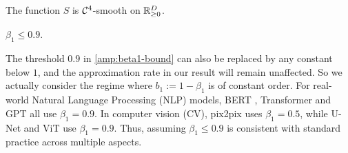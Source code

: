 

\begin{assumption}\label{amp:S-smooth}
    The function $S$ is $\mathcal{C}^4$-smooth on $\mathbb{R}_{\ge 0}^{D}$.
\end{assumption}



\begin{assumption}\label{amp:beta1-bound}
    $\beta_1 \leq 0.9$.
\end{assumption}


\begin{remark}\label{remark-0.9-mild}
The threshold $0.9$ in \cref{amp:beta1-bound} can also be replaced by any constant below $1$, and the approximation rate in our result will remain unaffected. So we actually consider the regime where $b_1 := 1 - \beta_1$ is of constant order. For real-world Natural Language Processing (NLP) models, BERT \citep{devlin-etal-2019-bert}, Transformer \citep{vaswani2017attention} and GPT \citep{radford2018improving} all use $\beta_1=0.9$. In computer vision (CV), pix2pix \citep{isola2017image} uses $\beta_1=0.5$, while U-Net \citep{ronneberger2015u} and ViT \citep{dosovitskiy2020image} use $\beta_1=0.9$. Thus, assuming $\beta_1 \leq 0.9$ is consistent with standard practice across multiple aspects.
\end{remark}


